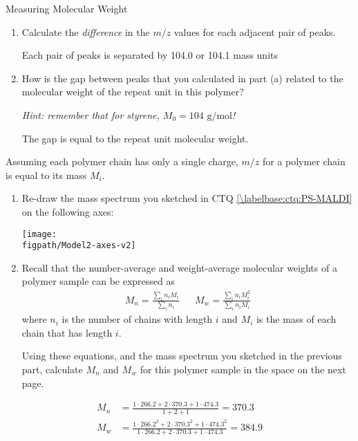 \begin{activity}{Measuring Molecular Weight}
\begin{ctqs}
		\begin{enumerate}
			\item Calculate the \emph{difference} in the $m/z$ values for each adjacent pair of peaks.
			
				\begin{solution}[0.75in]
					Each pair of peaks is separated by 104.0 or 104.1 mass units
				\end{solution}
			
			\item How is the gap between peaks that you calculated in part (a) related to the molecular weight of the repeat unit in this polymer?
			
				\emph{Hint: remember that for styrene, $M_0 = 104\text{ g/mol}$!}
			
				\begin{solution}[0.75in]
					The gap is equal to the repeat unit molecular weight.
				\end{solution}
			
		\end{enumerate}
		
	\question Assuming each polymer chain has only a single charge, $m/z$ for a polymer chain is equal to its mass $M_i$.
	
		\begin{enumerate}
			\item Re-draw the mass spectrum you sketched in CTQ \ref{\labelbase:ctq:PS-MALDI} on the following axes:
		
			\vspace{12pt}
			\centerline{\texttt{[image: \\figpath/Model2-axes-v2]}}
			
			\item Recall that the number-average and weight-average molecular weights of a polymer sample can be expressed as
		\begin{align*}
			M_n = \frac{\sum_i n_i M_i}{\sum_i n_i} && M_w = \frac{\sum_i n_i M_i^2}{\sum_i n_i M_i}
		\end{align*}
		where $n_i$ is the number of chains with length $i$ and $M_i$ is the mass of each chain that has length $i$.
		
				Using these equations, and the mass spectrum you sketched in the previous part, calculate $M_n$ and $M_w$ for this polymer sample in the space on the next page.
		\end{enumerate}
		
		\begin{solution}[3.5in]
			\begin{align*}
				M_n &= \frac{1\cdot 266.2 + 2\cdot 370.3 + 1\cdot 474.3}{1 + 2 + 1} = 370.3\\
				M_w &= \frac{1\cdot 266.2^2 + 2\cdot 370.3^2 + 1\cdot 474.3^2}{1\cdot 266.2 + 2\cdot 370.3 + 1\cdot 474.3} = 384.9
			\end{align*}
		\end{solution}
		

\end{ctqs}
\end{activity}
